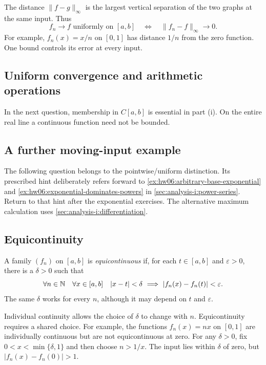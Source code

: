 The distance $\|f-g\|_\infty$ is the largest vertical separation of the
two graphs at the same input. Thus
\[
  f_n\longrightarrow f\text{ uniformly on }[a,b]
  \quad\Longleftrightarrow\quad
  \|f_n-f\|_\infty\longrightarrow0.
\]
For example, $f_n(x)=x/n$ on $[0,1]$ has distance $1/n$ from the zero
function. One bound controls its error at every input.


\subsection{Uniform convergence and arithmetic operations}

In the next question, membership in $C[a,b]$ is essential
in part (i). On the entire real line a continuous function need not be
bounded.



\subsection{A further moving-input example}

The following question belongs to the pointwise/uniform distinction.
Its prescribed hint deliberately refers forward to
\autoref{ex:hw06:arbitrary-base-exponential} and
\autoref{ex:hw06:exponential-dominates-powers} in
\autoref{sec:analysis-i:power-series}. Return to that hint after the
exponential exercises. The alternative maximum calculation uses
\autoref{sec:analysis-i:differentiation}.



\subsection{Equicontinuity}

\begin{definition}[Equicontinuity]
  \label{thm:analysis-i:equicontinuity}
  A family $(f_n)$ on $[a,b]$ is \emph{equicontinuous} if, for each
  $t\in[a,b]$ and $\varepsilon>0$, there is a $\delta>0$ such that
  \[
    \forall n\in\N\quad\forall x\in[a,b]\quad
    |x-t|<\delta\ \Longrightarrow\ |f_n(x)-f_n(t)|<\varepsilon.
  \]
  The same $\delta$ works for every $n$, although it may depend on
  $t$ and $\varepsilon$.
\end{definition}

Individual continuity allows the choice of $\delta$ to change with
$n$. Equicontinuity requires a shared choice. For example, the functions
$f_n(x)=nx$ on $[0,1]$ are individually continuous but are not
equicontinuous at zero. For any $\delta>0$, fix
$0<x<\min\{\delta,1\}$ and then choose $n>1/x$. The input lies within
$\delta$ of zero, but $|f_n(x)-f_n(0)|>1$.

